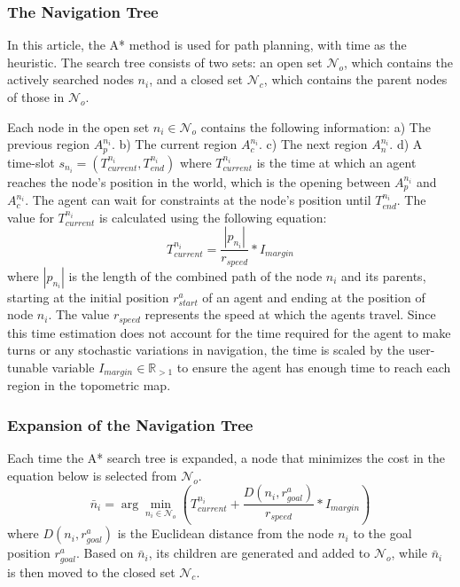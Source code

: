 \documentclass[letterpaper, 10 pt, conference]{ieeeconf}  %
\begin{document}
\subsubsection{The Navigation Tree}
In this article, the A* method is used for path planning, with time as the heuristic. The search tree consists of two sets: an open set $\mathcal{N}_o$, which contains the actively searched nodes $n_i$, and a closed set $\mathcal{N}_c$, which contains the parent nodes  of those in $\mathcal{N}_o$. 

Each node in the open set $n_i \in \mathcal{N}_o$ contains the following information: a) The previous region $A_p^{n_i}$. b) The current region $A_c^{n_i}$. c) The next region $A_n^{n_i}$. d) A time-slot $s_{n_i}=(T_{current}^{n_i}, T_{end}^{n_i})$ where $T_{current}^{n_i}$ is the time at which an agent reaches the node's position in the world, which is the opening between $A_p^{n_i}$ and $A_c^{n_i}$. The agent can wait for constraints at the node's position until $T_{end}^{n_i}$. The value for $T_{current}^{n_i}$ is calculated using the following equation:
\begin{equation}
\label{eq:updateCurrent}
    T_{current}^{n_i} = \frac{|p_{n_i}|}{r_{speed}} * I_{margin}
\end{equation} 
where $|p_{n_i}|$ is the length of the combined path of the node $n_i$ and its parents, starting at the initial position $r_{start}^a$ of an agent and ending at the position of node $n_i$. The value $r_{speed}$ represents the speed at which the agents travel. Since this time estimation does not account for the time required for the agent to make turns or any stochastic variations in navigation, the time is scaled by the user-tunable variable $I_{margin}\in \mathbb{R}_{>1}$ to ensure the agent has enough time to reach each region in the topometric map.

\subsubsection{Expansion of the Navigation Tree}
Each time the A* search tree is expanded, a node that minimizes the cost in the equation below is selected from $\mathcal{N}_o$. 
\begin{equation}
\label{eq:next_node}
    \bar{n}_i=\arg \min_{n_i \in \mathcal{N}_o} \left( T_{current}^{n_i} + \frac{D(n_i,r_{goal}^a)}{r_{speed}} * I_{margin}\right) 
\end{equation}
where $D(n_i,r_{goal}^a)$ is the Euclidean distance from the node $n_i$ to the goal position $r_{goal}^a$.
Based on $\bar{n}_i$, its children are generated and added to $\mathcal{N}_o$, while $\bar{n}_i$ is then moved to the closed set $\mathcal{N}_c$.
\end{document}
